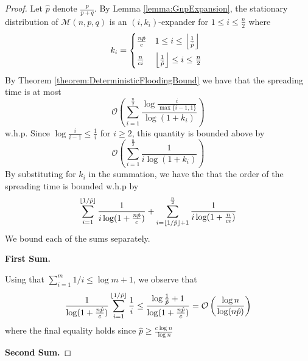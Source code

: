 \begin{proof}
	Let $\hat{p}$ denote $\frac{p}{p+q}$. 
	By Lemma \ref{lemma:GnpExpansion}, the stationary distribution of $\mathcal{M}(n, p, q)$ is an $(i, k_i)$-expander for $1 \leq i \leq \frac{n}{2}$ where 
	\begin{equation*}
		k_i = 
		\begin{cases*}
			\frac{n\hat{p}}{c} & $1 \leq i \leq \floor*{\frac{1}{\hat{p}}}$ \\
			\frac{n}{ci} & $\floor*{\frac{1}{\hat{p}}} \leq i \leq \frac{n}{2}$
		\end{cases*}
	\end{equation*}
	By Theorem \ref{theorem:DeterministicFloodingBound} we have that the spreading time is at most
	$$
		\mathcal{O}\left(\sum_{i=1}^\frac{n}{2} \frac{\log \frac{i}{\max\{i-1,1\}}}{\log(1+k_i)}\right)
	$$
	w.h.p.
	Since $\log \frac{i}{i-1} \leq \frac{1}{i}$ for $i \geq 2$,
	this quantity is bounded above by 
	$$
		\mathcal{O}\left(\sum_{i=1}^\frac{n}{2} \frac{1}{i\log(1+k_i)}\right)
	$$
	By substituting for $k_i$ in the summation, we have the that the order of the spreading time is bounded w.h.p by
	$$
		\sum_{i=1}^{\floor*{1/\hat{p}}} \frac{1}{i\log(1+\frac{n\hat{p}}{c})} 
		+
		\sum_{i=\floor*{1/\hat{p}} + 1}^\frac{n}{2} \frac{1}{i\log(1+\frac{n}{ci})} 
	$$
	We bound each of the sums separately.

	\textbf{First Sum.}

	Using that $\sum_{i=1}^m 1/i \leq \log m + 1$, 
	we observe that
	$$
		\frac{1}{\log(1+\frac{n\hat{p}}{c})} \sum_{i=1}^{\floor*{1/\hat{p}}} \frac{1}{i} 
		\leq 
		\frac{\log \frac{1}{\hat{p}} + 1}{\log(1+\frac{n\hat{p}}{c})} 
		= 
		\mathcal{O}\left(\frac{\log n}{\log(n\hat{p})}\right)
	$$
	where the final equality holds since $\hat{p} \geq \frac{c \log n}{\log n}$

	\textbf{Second Sum.}


\end{proof}
